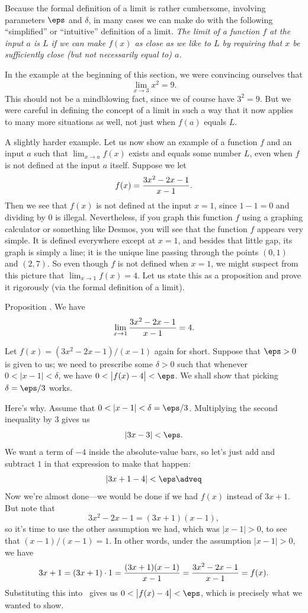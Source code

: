 Because the formal definition of a limit is rather cumbersome, involving parameters $\eps$ and $\delta$,
in many cases we can make do with the following ``simplified'' or ``intuitive'' definition of a limit.
{\sl
The limit of a function $f$ at the input $a$ is $L$ if we can make $f(x)$ as close as we like to $L$ by
requiring that $x$ be sufficiently close (but not necessarily equal to) $a$.}

In the example at the beginning of this section, we were convincing ourselves that
$$\lim_{x\to 3} x^2 = 9.$$
This should not be a mindblowing fact, since we of course have $3^2 = 9$. But we were careful in defining
the concept of a limit in such a way that it now applies to many more situations as well, not just when
$f(a)$ equals $L$.

\medskip\boldlabel A slightly harder example.
Let us now show an example of a function $f$ and an input $a$ such that $\lim_{x\to a} f(x)$ exists and equals
some number $L$, even when $f$ is not defined at the input $a$ itself. Suppose we let
$$f(x) = {3x^2-2x-1 \over x-1}.$$
Then we see that $f(x)$ is not defined at the input $x=1$, since $1-1 = 0$ and dividing by $0$ is
illegal. Nevertheless, if you graph this function $f$ using a graphing calculator or something like
Desmos, you will see that the function $f$ appears very simple. It is defined everywhere except at
$x=1$, and besides that little gap, its graph is simply a line; it is the unique line passing through
the points $(0,1)$ and $(2,7)$. So even though $f$ is not defined when $x=1$, we might suspect from this
picture that
$\lim_{x\to 1} f(x) = 4$.
Let us state this as a proposition and prove it rigorously (via the formal definition of a limit).

\edef\proplimfirstexample{\the\thmcount}
\proclaim Proposition \advthm. We have
$$\lim_{x\to 1} {3x^2-2x-1 \over x-1} = 4.$$

\proof Let $f(x) = (3x^2 - 2x-1)/(x-1)$ again for short. Suppose that $\eps > 0$ is given to us;
we need to prescribe some $\delta>0$ such that whenever $0<|x-1|<\delta$, we have
$0< \bigl| f(x) - 4\bigr| < \eps$. We shall show that picking $\delta = \eps/3$ works.

Here's why. Assume that $0<|x-1|<\delta = \eps/3$. Multiplying the second inequality by $3$ gives us
$$|3x-3| < \eps.$$
We want a term of $-4$ inside the absolute-value bars, so let's just add and subtract $1$ in that expression
to make that happen:
\edef\eqlimitexample{\the\eqcount}
$$|3x+1 - 4| < \eps\adveq$$
Now we're almost done---we would be done if we had $f(x)$ instead of $3x+1$. But note that
$$3x^2 - 2x-1 = (3x+1)(x-1),$$
so it's time to use the other assumption we had,
which was $|x-1| > 0$, to see that $(x-1)/(x-1) = 1$. In other words, under the assumption $|x-1|>0$,
we have
$$ 3x+1 = (3x+1)\cdot 1 = {(3x+1)(x-1)\over x-1} = {3x^2-2x-1\over x-1} = f(x).$$
Substituting this into~\refeq{\eqlimitexample} gives us
$0< \bigl| f(x) - 4\bigr| < \eps$,
which is precisely what we wanted to show.\slug


